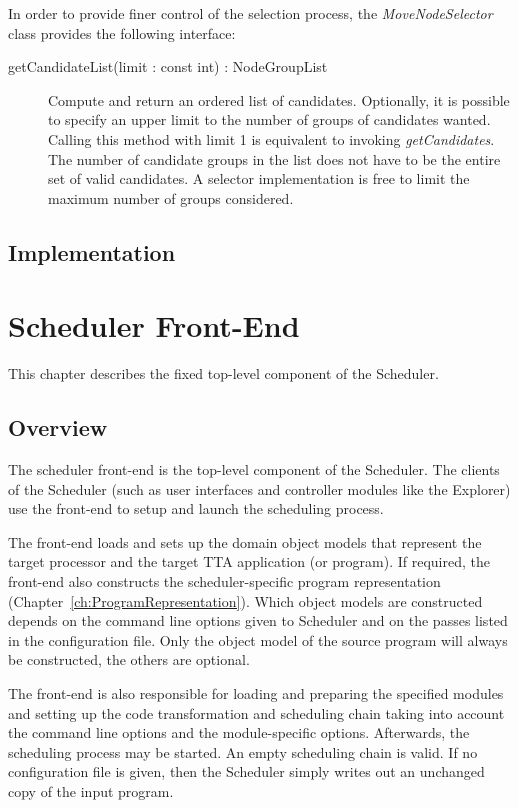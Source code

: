 \documentclass[a4paper,twoside]{tce}
\begin{document}
In order to provide finer control of the selection process,
%
%
the \emph{MoveNodeSelector} class provides the following interface:
\begin{description}
\item[getCandidateList(limit : const int) : NodeGroupList]%
  Compute and return an ordered list of candidates. Optionally, it is
  possible to specify an upper limit to the number of groups of candidates
  wanted. Calling this method with limit 1 is equivalent to invoking
  \emph{getCandidates}. The number of candidate groups in the list does not
  have to be the entire set of valid candidates. A selector implementation
  is free to limit the maximum number of groups considered.
\end{description}

\section{Implementation}



\chapter{Scheduler Front-End}

This chapter describes the fixed top-level component of the Scheduler.

\section{Overview}

The scheduler front-end is the top-level component of the Scheduler. The
clients of the Scheduler (such as user interfaces and controller modules
like the Explorer) use the front-end to setup and launch the scheduling
process.

The front-end loads and sets up the domain object models that
represent the target processor and the target TTA application (or
program). If required, the front-end also constructs the
scheduler-specific program representation
(Chapter~\ref{ch:ProgramRepresentation}). Which object models are
constructed depends on the command line options given to Scheduler and
on the passes listed in the configuration file. Only the object model
of the source program will always be constructed, the others are
optional.

The front-end is also responsible for loading and preparing the specified
modules and setting up the code transformation and scheduling chain taking
into account the command line options and the module-specific options.
Afterwards, the scheduling process may be started. An empty scheduling chain
is valid. If no configuration file is given, then the Scheduler simply
writes out an unchanged copy of the input program.
\end{document}
